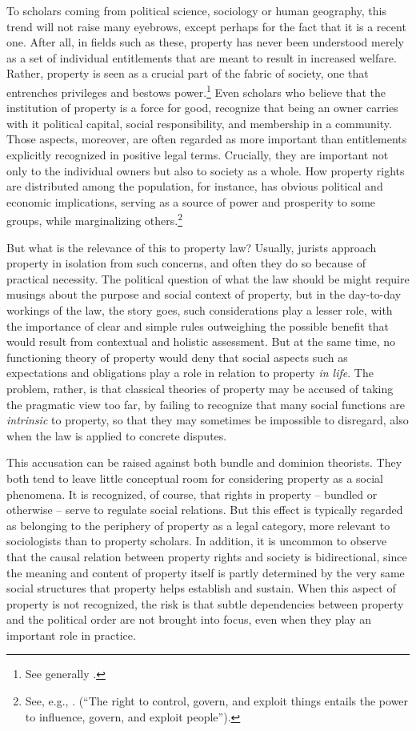 To scholars coming from political science, sociology or human geography, this trend will not raise many eyebrows, except perhaps for the fact that it is a recent one. After all, in fields such as these, property has never been understood merely as a set of individual entitlements that are meant to result in increased welfare. Rather, property is seen as a crucial part of the fabric of society, one that entrenches privileges and bestows power.\footnote{See generally \cite{carruthers04}.} Even scholars who believe that the institution of property is a force for good, recognize that being an owner carries with it political capital, social responsibility, and membership in a community. Those aspects, moreover, are often regarded as more important than entitlements explicitly recognized in positive legal terms. Crucially, they are important not only to the individual owners but also to society as a whole. How property rights are distributed among the population, for instance, has obvious political and economic implications, serving as a source of power and prosperity to some groups, while marginalizing others.\footnote{See, e.g., \cite[23]{carruthers04}. (``The right to control, govern, and exploit things entails the power to influence, govern, and exploit people'').}

But what is the relevance of this to property law? Usually, jurists approach property in isolation from such concerns, and often they do so because of practical necessity. The political question of what the law should be might require musings about the purpose and social context of property, but in the day-to-day workings of the law, the story goes, such considerations play a lesser role, with the importance of clear and simple rules outweighing the possible benefit that would result from contextual and holistic assessment. But at the same time, no functioning theory of  property would deny that social aspects such as expectations and obligations play a role in relation to property {\it in life}. The problem, rather, is that classical theories of property may be accused of taking the pragmatic view too far, by failing to recognize that many social functions are {\it intrinsic} to property, so that they may sometimes be impossible to disregard, also when the law is applied to concrete disputes.

This accusation can be raised against both bundle and dominion theorists. They both tend to leave little conceptual room for considering property as a social phenomena. It is recognized, of course, that rights in property -- bundled or otherwise -- serve to regulate social relations. But this effect is typically regarded as belonging to the periphery of property as a legal category, more relevant to sociologists than to property scholars. In addition, it is uncommon to observe that the causal relation between property rights and society is bidirectional, since the meaning and content of property itself is partly determined by the very same social structures that property helps establish and sustain. When this aspect of property is not recognized, the risk is that subtle dependencies between property and the political order are not brought into focus, even when they play an important role in practice.

